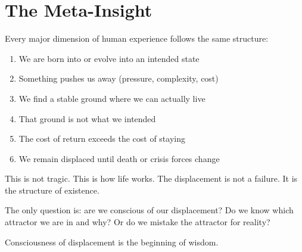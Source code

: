 \documentclass[12pt]{article}
\theoremstyle{definition}
\theoremstyle{remark}
\begin{document}
\section{The Meta-Insight}

Every major dimension of human experience follows the same structure:

\begin{enumerate}
\item We are born into or evolve into an intended state
\item Something pushes us away (pressure, complexity, cost)
\item We find a stable ground where we can actually live
\item That ground is not what we intended
\item The cost of return exceeds the cost of staying
\item We remain displaced until death or crisis forces change
\end{enumerate}

This is not tragic. This is how life works. The displacement is not a failure. It is the structure of existence.

The only question is: are we conscious of our displacement? Do we know which attractor we are in and why? Or do we mistake the attractor for reality?

Consciousness of displacement is the beginning of wisdom.
\end{document}

